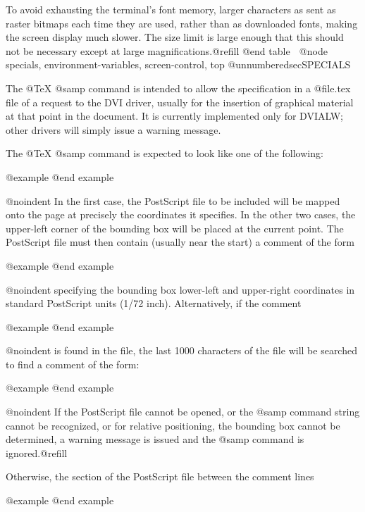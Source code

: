 {To avoid exhausting the terminal's font memory, larger
characters as sent as raster bitmaps each time they are
used, rather than as downloaded fonts, making the screen
display much slower.  The size limit is large enough that
this should not be necessary except at large
magnifications.@refill
@end table

@node specials, environment-variables, screen-control, top
@unnumberedsec{SPECIALS}

The @TeX{} @samp{} command is intended to allow the
specification in a @file{.tex} file of a request to the DVI
driver, usually for the insertion of graphical material at that
point in the document.  It is currently implemented only for
DVIALW; other drivers will simply issue a warning message.

The @TeX{} @samp{} command is expected to look like one
of the following:

@example
@end example

@noindent
In the first case, the PostScript file to be included will be
mapped onto the page at precisely the coordinates it specifies.
In the other two cases, the upper-left corner of the bounding box
will be placed at the current point.  The PostScript file must
then contain (usually near the start) a comment of the form

@example
@end example

@noindent
specifying the bounding  box lower-left and upper-right
coordinates in standard PostScript units (1/72 inch).
Alternatively, if the comment

@example
@end example

@noindent
is found in the file,   the last 1000 characters of the file will
be searched to find a comment of the form:

@example
@end example

@noindent
If the PostScript file cannot be opened, or the
@samp{} command string cannot be recognized, or for
relative positioning, the bounding box cannot be determined, a
warning message is issued and the @samp{} command is
ignored.@refill

Otherwise, the section of the PostScript file between the
comment lines

@example
@end example

}
